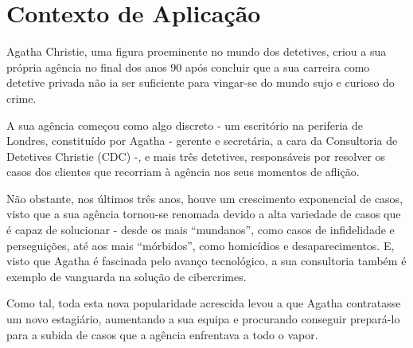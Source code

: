 \documentclass[a4paper,12pt]{scrreprt}
\begin{document}
    \section{Contexto de Aplicação}
    Agatha Christie, uma figura proeminente no mundo dos detetives, criou a sua própria agência
    no final dos anos 90 após concluir que a sua carreira como detetive privada não ia ser
    suficiente para vingar-se do mundo sujo e curioso do crime.
    \par A sua agência começou como algo discreto - um escritório na periferia de Londres,
    constituído por Agatha - gerente e secretária, a cara da Consultoria de Detetives Christie
    (CDC) -, e mais três detetives, responsáveis por resolver os casos dos clientes que recorriam
    à agência nos seus momentos de aflição.
    \par Não obstante, nos últimos três anos, houve um crescimento exponencial de casos, visto que a
    sua agência tornou-se renomada devido a alta variedade de casos que é capaz de solucionar -
    desde os mais “mundanos”, como casos de infidelidade e perseguições, até aos mais
    “mórbidos”, como homicídios e desaparecimentos. E, visto que Agatha é fascinada pelo avanço
    tecnológico, a sua consultoria também é exemplo de vanguarda na solução de cibercrimes.
    \par Como tal, toda esta nova popularidade acrescida levou a que Agatha contratasse um novo
    estagiário, aumentando a sua equipa e procurando conseguir prepará-lo para a subida de
    casos que a agência enfrentava a todo o vapor.
\end{document}
